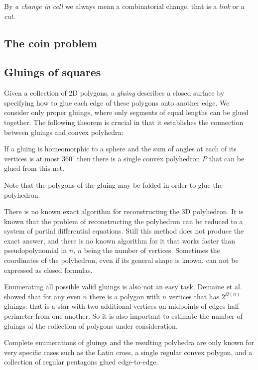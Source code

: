 \documentclass[a4paper,11pt]{article}
\begin{document}
By {\itshape a change in cell} we always mean a combinatorial change, that is a {\itshape link} or a {\itshape cut}.

\subsection{The coin problem}



\subsection{Gluings of squares}

Given a collection of 2D polygons, a \emph{gluing} describes a closed surface by specifying how to glue each edge of these polygons onto another edge. We consider only proper gluings, where only segments of equal lengths can be glued together. The following theorem is crucial in that it establishes the connection between gluings and convex polyhedra:

\begin{theorem}
\label{thm:alexandrov}
	If a gluing is homeomorphic to a sphere and the sum of angles at each of its vertices is at most $360^\circ$ then there is a single convex polyhedron $P$ that can be glued from this net.
\end{theorem}

Note that the polygons of the gluing may be folded in order to glue the polyhedron.

There is no known exact algorithm for reconstructing the 3D polyhedron.
It is known that the problem of reconstructing the polyhedron can be
reduced to a system of partial differential equations.
Still this method does not produce the exact answer, and there is no
known algorithm for it that works faster than pseudopolynomial in $n$,
$n$ being the number of vertices. Sometimes the coordinates of the
polyhedron, even if its general shape is known, can not be
expressed as closed formulas.

Enumerating all possible valid gluings is also not an easy task. Demaine et al. showed that for any even $n$ there is a polygon with $n$ vertices that has $2^{\Omega (n)}$ gluings: that is a star with two additional vertices on midpoints of edges half perimeter from one another. So it is also important to estimate the number of gluings of the collection of polygons under consideration.

Complete enumerations of gluings and the resulting polyhedra are only known for very specific cases such as the Latin cross, a single regular convex polygon, and a collection of regular pentagons glued edge-to-edge.
\end{document}
